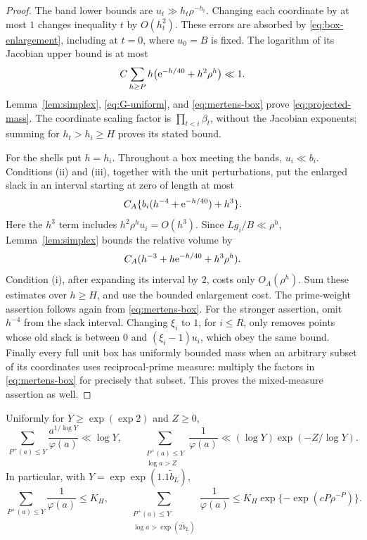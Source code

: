 \begin{proof}
The band lower bounds are \(u_t\gg h_t\rho^{-h_t}\).
Changing each coordinate by at most \(1\) changes inequality \(t\)
by \(O(h_t^2)\).  These errors are absorbed by
\eqref{eq:box-enlargement}, including at \(t=0\), where \(u_0=B\)
is fixed.  The logarithm of its Jacobian upper bound is at most
\[
 C\sum_{h\ge P}h\bigl(\mathrm e^{-h/40}+h^2\rho^h\bigr)\ll1.
\]
Lemma~\ref{lem:simplex}, \eqref{eq:G-uniform}, and
\eqref{eq:mertens-box} prove \eqref{eq:projected-mass}.
The coordinate scaling factor is \(\prod_{t<i}\beta_t\), without
the Jacobian exponents; summing for \(h_t>h_i\ge H\) proves its
stated bound.

For the shells put \(h=h_i\).  Throughout a box meeting the bands,
\(u_i\ll b_i\).  Conditions (ii) and (iii), together with the unit
perturbations, put the enlarged slack in an interval starting at
zero of length at most
\[
 C_A\{b_i(h^{-4}+\mathrm e^{-h/40})+h^3\}.
\]
Here the \(h^3\) term includes
\(h^2\rho^hu_i=O(h^3)\).
Since \(Lg_i/B\ll\rho^h\), Lemma~\ref{lem:simplex} bounds the
relative volume by
\[
 C_A(h^{-3}+h\mathrm e^{-h/40}+h^3\rho^h).
\]
Condition (i), after expanding its interval by \(2\), costs only
\(O_A(\rho^h)\).  Sum these estimates over \(h\ge H\), and use
the bounded enlargement cost.  The prime-weight assertion follows
again from \eqref{eq:mertens-box}.
For the stronger assertion, omit \(h^{-4}\) from the slack interval.
Changing \(\xi_i\) to \(1\), for \(i\le R\), only removes points whose old slack is
between \(0\) and \((\xi_i-1)u_i\), which obey the same bound.
Finally every full unit box has uniformly bounded mass when an
arbitrary subset of its coordinates uses reciprocal-prime measure:
multiply the factors in \eqref{eq:mertens-box} for precisely that
subset.  This proves the mixed-measure assertion as well.
\end{proof}

\begin{lemma}\label{lem:smooth-tail}
Uniformly for \(Y\ge\exp(\exp2)\) and \(Z\ge0\),
\[
 \sum_{P^+(a)\le Y}\frac{a^{1/\log Y}}{\varphi(a)}\ll\log Y,
 \qquad
 \sum_{\substack{P^+(a)\le Y\\\log a>Z}}\frac1{\varphi(a)}
 \ll(\log Y)\exp(-Z/\log Y).
\]
In particular, with \(Y=\exp\exp(1.1\widetilde b_L)\),
\begin{equation}\label{eq:smooth-cost}
 \sum_{P^+(a)\le Y}\frac1{\varphi(a)}\le K_H,\qquad
 \sum_{\substack{P^+(a)\le Y\\\log a>\exp(2\widetilde b_L)}}
 \frac1{\varphi(a)}
 \le K_H\exp\{-\exp(cP\rho^{-P})\}.
\end{equation}
\end{lemma}

